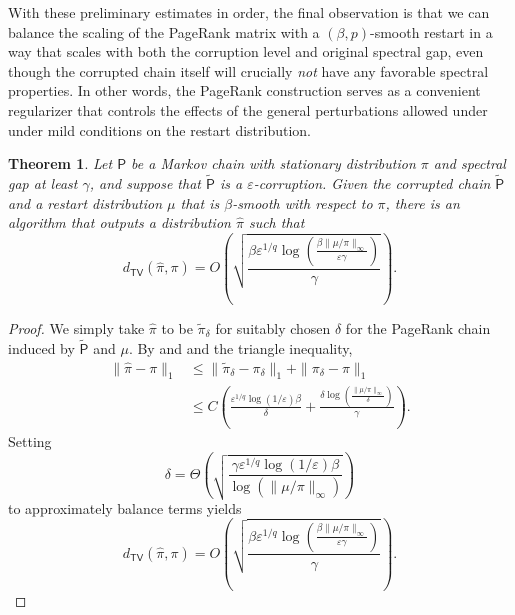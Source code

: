 \documentclass[11pt]{article}
\newtheorem{thm}{Theorem}[section]
\theoremstyle{remark}
\begin{document}
With these preliminary estimates in order, the final observation is that we can balance the scaling of the PageRank matrix with a $(\beta,p)$-smooth restart in a way that scales with both the corruption level and original spectral gap, even though the corrupted chain itself will crucially \emph{not} have any favorable spectral properties. In other words, the PageRank construction serves as a convenient regularizer that controls the effects of the general perturbations allowed under  under mild conditions on the restart distribution.
\begin{thm}
\label{thm:main_body}
        Let $\mathsf{P}$ be a Markov chain with stationary distribution $\pi$ and spectral gap at least $\gamma$, and suppose that $\widetilde{\mathsf{P}}$ is a $\varepsilon$-corruption. Given the corrupted chain $\widetilde{\mathsf{P}}$ and a restart distribution $\mu$ that is $\beta$-smooth with respect to $\pi$, there is an algorithm that outputs a distribution $\widehat{\pi}$ such that
    \begin{equation*}
        d_{\mathsf{TV}}(\widehat{\pi},\pi)=O\left(\sqrt{\frac{\beta\varepsilon^{1/q}\log\left(\frac{\beta \|\mu/\pi\|_{\infty}}{\varepsilon\gamma}\right)}{\gamma}}\right).
    \end{equation*}
\end{thm}
\begin{proof}
We simply take $\widehat{\pi}$ to be $\widetilde{\pi}_{\delta}$ for suitably chosen $\delta$ for the PageRank chain induced by $\widetilde{\mathsf{P}}$ and $\mu$. By  and  and the triangle inequality,
\begin{align*}
    \|\widehat{\pi}-\pi\|_1&\leq \|\widetilde{\pi}_{\delta}-\pi_{\delta}\|_1+\|\pi_{\delta}-\pi\|_1\\
    &\leq C\left(\frac{\varepsilon^{1/q}\log(1/\varepsilon)\beta}{\delta}+\frac{\delta\log\left(\frac{\|\mu/\pi\|_{\infty}}{\delta}\right)}{\gamma}\right).
\end{align*}
Setting 
\begin{equation*}
    \delta=\Theta\left(\sqrt{\frac{\gamma\varepsilon^{1/q}\log(1/\varepsilon)\beta}{\log(\|\mu/\pi\|_{\infty})}}\right)
\end{equation*}
to approximately balance terms yields
\begin{equation*}
    d_{\mathsf{TV}}(\widehat{\pi},\pi)=O\left(\sqrt{\frac{\beta\varepsilon^{1/q}\log\left(\frac{\beta \|\mu/\pi\|_{\infty}}{\varepsilon\gamma}\right)}{\gamma}}\right).
\end{equation*}
\end{proof}
\end{document}
